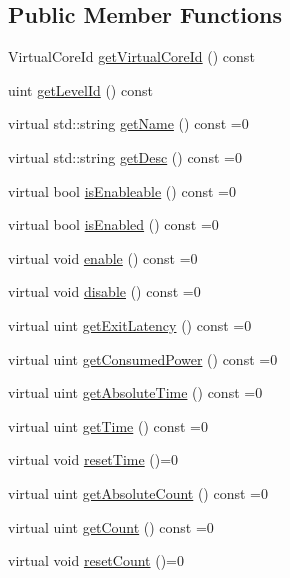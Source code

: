 \subsection*{Public Member Functions}
\begin{DoxyCompactItemize}
\item 
Virtual\-Core\-Id \hyperlink{classmammut_1_1topology_1_1VirtualCoreIdleLevel_a1145d3ff6d9052589afc4b308896e789}{get\-Virtual\-Core\-Id} () const 
\item 
uint \hyperlink{classmammut_1_1topology_1_1VirtualCoreIdleLevel_a0b3c6dc7b77dedb33753c751f59b3b42}{get\-Level\-Id} () const 
\item 
virtual std\-::string \hyperlink{classmammut_1_1topology_1_1VirtualCoreIdleLevel_a0e11b685cd38c09e4e6fd7610670ffd5}{get\-Name} () const =0
\item 
virtual std\-::string \hyperlink{classmammut_1_1topology_1_1VirtualCoreIdleLevel_af2542933dbfe7e83ff9c522a43d96d45}{get\-Desc} () const =0
\item 
virtual bool \hyperlink{classmammut_1_1topology_1_1VirtualCoreIdleLevel_afac261b8838df4df7f694dab365643d2}{is\-Enableable} () const =0
\item 
virtual bool \hyperlink{classmammut_1_1topology_1_1VirtualCoreIdleLevel_acabc887668492f3e085aae5bb905558a}{is\-Enabled} () const =0
\item 
virtual void \hyperlink{classmammut_1_1topology_1_1VirtualCoreIdleLevel_aac5bccbd57ef3246ac6c268204a337ab}{enable} () const =0
\item 
virtual void \hyperlink{classmammut_1_1topology_1_1VirtualCoreIdleLevel_a25ce6958cae064d55055c7940d236f9d}{disable} () const =0
\item 
virtual uint \hyperlink{classmammut_1_1topology_1_1VirtualCoreIdleLevel_ab4ab28cce2c5b0d46b94cb0bae02bba5}{get\-Exit\-Latency} () const =0
\item 
virtual uint \hyperlink{classmammut_1_1topology_1_1VirtualCoreIdleLevel_a0be5f6e317cbfeb8825a21f13ae3e78d}{get\-Consumed\-Power} () const =0
\item 
virtual uint \hyperlink{classmammut_1_1topology_1_1VirtualCoreIdleLevel_ae841eaa71ad7accb31c37f06f6479030}{get\-Absolute\-Time} () const =0
\item 
virtual uint \hyperlink{classmammut_1_1topology_1_1VirtualCoreIdleLevel_a44854d4cd60b782ae2738fff8e86ca6e}{get\-Time} () const =0
\item 
virtual void \hyperlink{classmammut_1_1topology_1_1VirtualCoreIdleLevel_a22fff5c84d8b377fa1845cafd0df0112}{reset\-Time} ()=0
\item 
virtual uint \hyperlink{classmammut_1_1topology_1_1VirtualCoreIdleLevel_a77b2e87e91dedf6dfa593324875c94fa}{get\-Absolute\-Count} () const =0
\item 
virtual uint \hyperlink{classmammut_1_1topology_1_1VirtualCoreIdleLevel_a031d27afe2c4a164f35fc2c2eeaa22ca}{get\-Count} () const =0
\item 
virtual void \hyperlink{classmammut_1_1topology_1_1VirtualCoreIdleLevel_adf46930dfd0fc152490405f586394fd3}{reset\-Count} ()=0
\end{DoxyCompactItemize}

